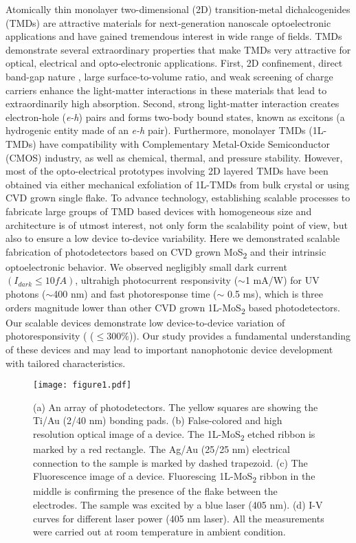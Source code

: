 \documentclass[%
 reprint,%
 amssymb, amsmath,%
 aip,cha,%
]{revtex4-1}
\begin{document}
Atomically thin monolayer two-dimensional (2D) transition-metal dichalcogenides (TMDs) are attractive materials for next-generation nanoscale optoelectronic applications and have gained tremendous interest in wide range of fields. \cite{1,2,3,4} TMDs demonstrate several extraordinary properties that make TMDs very attractive for optical, electrical and opto-electronic applications. First, 2D confinement, direct band-gap nature \cite{5}, large surface-to-volume ratio\cite{6}, and weak screening of charge carriers enhance the light-matter interactions \cite{5, 7, 8, 9, 10} in these materials that lead to extraordinarily high absorption. Second, strong light-matter interaction creates electron-hole (\textit{e-h}) pairs and forms two-body bound states, known as excitons (a hydrogenic entity made of an \textit{e-h} pair). \cite{11, 12, 13, 14, 15, 16} Furthermore, monolayer TMDs (1L-TMDs) have compatibility with Complementary Metal-Oxide Semiconductor (CMOS) industry\cite{17}, as well as chemical, thermal, and pressure stability. \cite{18}However, most of the opto-electrical prototypes involving 2D layered TMDs have been obtained via either mechanical exfoliation of 1L-TMDs from bulk crystal \cite{2, 11}or using CVD grown single flake. \cite{19, 20}To advance technology, establishing scalable processes to fabricate large groups of TMD based devices with homogeneous size and architecture is of utmost interest, not only form the scalability point of view, but also to ensure a low device to-device variability. Here we  demonstrated scalable fabrication of photodetectors based on CVD grown MoS\textsubscript{2} and their intrinsic optoelectronic behavior. We  observed negligibly small dark current $(I_{dark}\leqslant10 fA)$, ultrahigh photocurrent responsivity ($\sim$1 mA/W) for UV photons ($\sim$400 nm) and fast photoresponse time ($\sim$ 0.5 ms), which is three orders magnitude lower than other CVD grown 1L-MoS\textsubscript{2} based photodetectors. \cite{21} Our scalable devices demonstrate low device-to-device variation of photoresponsivity ( ($\leqslant 300\%$)). Our study provides a fundamental understanding of these devices and may lead to important nanophotonic device development with tailored characteristics.

\begin{figure*}[t]
\centering
\begin{minipage}{\textwidth}
\texttt{[image: figure1.pdf]}
\caption{(a) An array of photodetectors. The yellow squares are showing the Ti/Au (2/40 nm) bonding pads. (b) False-colored and high resolution optical image of a device. The 1L-MoS\textsubscript{2} etched ribbon is marked by a red rectangle. The Ag/Au (25/25 nm) electrical connection to the sample is marked by dashed trapezoid. (c) The Fluorescence image of a device. Fluorescing 1L-MoS\textsubscript{2} ribbon in the middle is confirming the presence of the flake between the electrodes. The sample was excited by a blue laser (405 nm). (d) I-V curves for different laser power (405 nm laser). All the measurements were carried out at room temperature in ambient condition. \label{figure1}}
\end{minipage}
\end{figure*}
\end{document}
